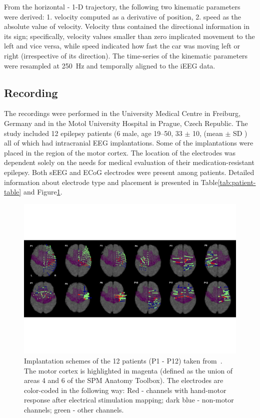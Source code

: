 From the horizontal - 1-D trajectory, the following two kinematic parameters were derived:
1. velocity computed as a derivative of position, 2. speed as the absolute value of velocity.
Velocity thus contained the directional information in its sign;
specifically, velocity values smaller than zero implicated movement to the left and vice versa, while speed indicated how fast the car was moving left or right (irrespective of its direction).
The time-series of the kinematic parameters were resampled at 250~Hz and temporally aligned to the iEEG data.

\subsection{Recording}\label{subsec:recording}
The recordings were performed in the University Medical Centre in Freiburg, Germany and in the Motol University Hospital in Prague, Czech Republic.
The study included 12 epilepsy patients (6 male, age 19--50,  33 $\pm$ 10, (mean $\pm$ SD ) all of which had intracranial EEG implantations.
Some of the implantations were placed in the region of the motor cortex.
The location of the electrodes was dependent solely on the needs for medical evaluation of their medication-resistant epilepsy.
Both sEEG and ECoG electrodes were present among patients.
Detailed information about electrode type and placement is presented in Table\ref{tab:patient-table} and Figure\ref{fig:electrodes}.

\begin{figure}[!htbp]
\centering
\includegraphics[width=0.8\linewidth]{img/ch3/electrodes}
\caption[Implantation schemes]{Implantation schemes of the 12 patients (P1 - P12) taken from~\cite{Hammer-2021}. The motor cortex is highlighted in magenta (defined as the union of areas 4 and 6 of the SPM Anatomy Toolbox). The electrodes are color-coded in the following way: Red - channels with hand-motor response after electrical stimulation mapping; dark blue - non-motor channels; green - other channels.}
\label{fig:electrodes}
\end{figure}

